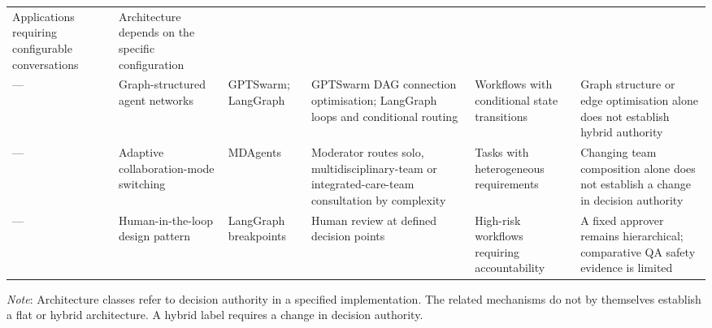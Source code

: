 \begin{table}[pos=t]
\begin{tabular}{p{1.4cm} p{2.0cm} p{2.4cm} p{3.2cm} p{2.3cm} p{2.2cm}}
    Applications requiring configurable conversations &
    Architecture depends on the specific configuration \\
    --- & Graph-structured agent networks & GPTSwarm; LangGraph
    \citep{zhuge2024gptswarm,langgraph2024} &
    GPTSwarm DAG connection optimisation; LangGraph loops and conditional routing &
    Workflows with conditional state transitions &
    Graph structure or edge optimisation alone does not establish hybrid authority \\
    --- & Adaptive collaboration-mode switching & MDAgents \citep{kim2024mdagents} &
    Moderator routes solo, multidisciplinary-team or integrated-care-team consultation by complexity &
    Tasks with heterogeneous requirements &
    Changing team composition alone does not establish a change in decision authority \\
    --- & Human-in-the-loop design pattern & LangGraph breakpoints \citep{langgraph2024interrupt} &
    Human review at defined decision points &
    High-risk workflows requiring accountability &
    A fixed approver remains hierarchical; comparative QA safety evidence is limited \\
    \bottomrule
  \end{tabular}
  \par\smallskip\footnotesize
  \textit{Note}: Architecture classes refer to decision authority in a specified
  implementation. The related mechanisms do not by themselves establish a flat
  or hybrid architecture. A hybrid label requires a change in decision authority.
\end{table}